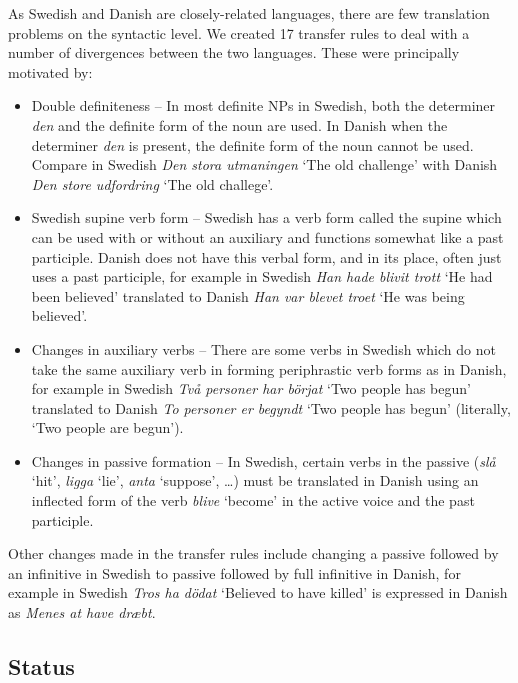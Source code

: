 \documentclass[11pt]{article}
\begin{document}
As Swedish and Danish are closely-related languages, there are few translation problems
on the syntactic level. We created 17 transfer rules to deal with a number of divergences 
between the two languages. These were principally motivated by:

\begin{itemize}
  \item  Double definiteness -- In most definite NPs in Swedish, both the determiner \emph{den}
    and the definite form of the noun are used. In Danish when the determiner \emph{den} is 
    present, the definite form of the noun cannot be used. Compare in Swedish \emph{Den stora utmaningen}
    `The old challenge' with Danish \emph{Den store udfordring} `The old challege'.
  \item  Swedish supine verb form -- Swedish has a verb form called the supine which can be used with
    or without an auxiliary and functions somewhat like a past participle. Danish does not have this 
    verbal form, and in its place, often just uses a past participle, for example in Swedish 
    \emph{Han hade blivit trott} `He had been believed' translated to Danish \emph{Han var blevet troet} 
    `He was being believed'.
  \item  Changes in auxiliary verbs -- There are some verbs in Swedish which do not take the same 
    auxiliary verb in forming periphrastic verb forms as in Danish, for example in Swedish \emph{Två 
    personer har börjat} `Two people has begun' translated to Danish \emph{To personer er begyndt} 
    `Two people has begun' (literally, `Two people are begun').
  \item  Changes in passive formation -- In Swedish, certain verbs in the passive (\emph{slå} `hit', 
    \emph{ligga} `lie', \emph{anta} `suppose', \ldots) must be translated in Danish using an inflected 
    form of the verb \emph{blive} `become' in the active voice and the past participle.
\end{itemize}

Other changes made in the transfer rules include changing a passive followed by an infinitive in Swedish
to passive followed by full infinitive in Danish, for example in Swedish \emph{Tros ha dödat} `Believed to have killed' is expressed in Danish as \emph{Menes at have dræbt}.

\subsection{Status}
\end{document}
